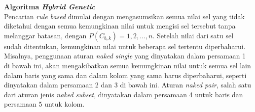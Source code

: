\documentclass[a4paper,twoside]{article}
\begin{document}
\begin{enumerate}
\textbf{Algoritma \textit{Hybrid Genetic}} \\

Pencarian \textit{rule based} dimulai dengan mengasumsikan semua nilai sel yang tidak diketahui dengan semua kemungkinan nilai untuk mengisi sel tersebut tanpa melanggar batasan, dengan \begin{math}P(C_{b,k}) = {1, 2, ..., n}\end{math}. Setelah nilai dari satu sel sudah ditentukan, kemungkinan nilai untuk beberapa sel tertentu diperbaharui. Misalnya, penggunaan aturan \textit{naked single} yang dinyatakan dalam persamaan 1 di bawah ini, akan mengakibatkan semua kemungkinan nilai untuk semua sel lain dalam baris yang sama dan dalam kolom yang sama harus diperbaharui, seperti dinyatakan dalam persamaan 2 dan 3 di bawah ini. Aturan \textit{naked pair}, salah satu dari aturan jenis \textit{naked subset}, dinyatakan dalam persamaan 4 untuk baris dan persamaan 5 untuk kolom. ~\cite{JohannaLukasSaputra}


\end{enumerate}
\end{document}
